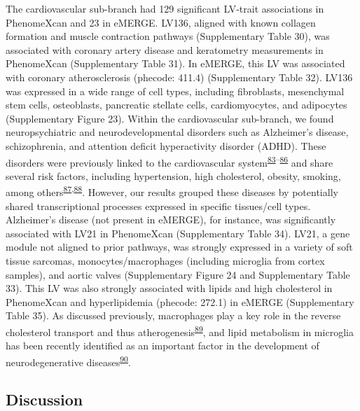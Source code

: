 \documentclass[
  a4paper,
]{article}
\begin{document}
The cardiovascular sub-branch had 129 significant LV-trait associations in PhenomeXcan and 23 in eMERGE.
LV136, aligned with known collagen formation and muscle contraction pathways (Supplementary Table 30), was associated with coronary artery disease and keratometry measurements in PhenomeXcan (Supplementary Table 31).
In eMERGE, this LV was associated with coronary atherosclerosis (phecode: 411.4) (Supplementary Table 32).
LV136 was expressed in a wide range of cell types, including fibroblasts, mesenchymal stem cells, osteoblasts, pancreatic stellate cells, cardiomyocytes, and adipocytes (Supplementary Figure 23).
Within the cardiovascular sub-branch, we found neuropsychiatric and neurodevelopmental disorders such as Alzheimer's disease, schizophrenia, and attention deficit hyperactivity disorder (ADHD).
These disorders were previously linked to the cardiovascular system\textsuperscript{\protect\hyperlink{ref-10qjLoufR}{83}--\protect\hyperlink{ref-13t4TuFeJ}{86}} and share several risk factors, including hypertension, high cholesterol, obesity, smoking, among others\textsuperscript{\protect\hyperlink{ref-D83Aqhga}{87},\protect\hyperlink{ref-9BGyO071}{88}}.
However, our results grouped these diseases by potentially shared transcriptional processes expressed in specific tissues/cell types.
Alzheimer's disease (not present in eMERGE), for instance, was significantly associated with LV21 in PhenomeXcan (Supplementary Table 34).
LV21, a gene module not aligned to prior pathways, was strongly expressed in a variety of soft tissue sarcomas, monocytes/macrophages (including microglia from cortex samples), and aortic valves (Supplementary Figure 24 and Supplementary Table 33).
This LV was also strongly associated with lipids and high cholesterol in PhenomeXcan and hyperlipidemia (phecode: 272.1) in eMERGE (Supplementary Table 35).
As discussed previously, macrophages play a key role in the reverse cholesterol transport and thus atherogenesis\textsuperscript{\protect\hyperlink{ref-idlBgtFz}{89}}, and lipid metabolism in microglia has been recently identified as an important factor in the development of neurodegenerative diseases\textsuperscript{\protect\hyperlink{ref-18I4ish9s}{90}}.

\hypertarget{discussion}{%
\subsection{Discussion}\label{discussion}}
\end{document}
